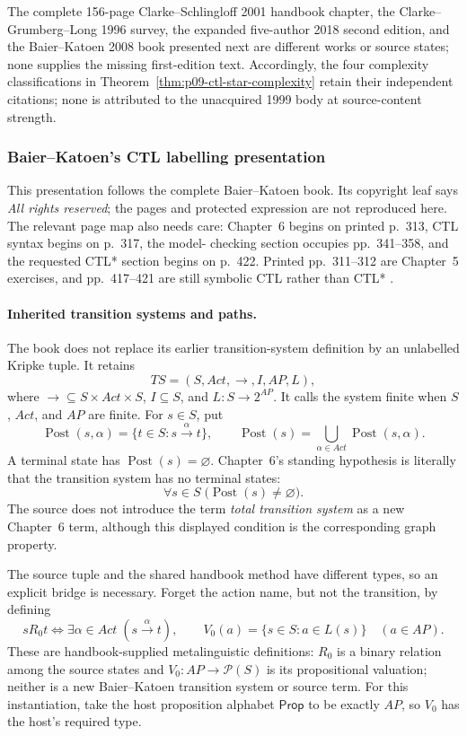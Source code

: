 The complete 156-page Clarke--Schlingloff 2001 handbook chapter, the
Clarke--Grumberg--Long 1996 survey, the expanded five-author 2018 second
edition, and the Baier--Katoen 2008 book presented next are different works or
source states; none supplies the missing first-edition text.  Accordingly,
the four complexity classifications in
Theorem~\ref{thm:p09-ctl-star-complexity} retain their independent citations;
none is attributed to the unacquired 1999 body at source-content strength.

\subsubsection{Baier--Katoen's CTL labelling presentation}
\label{sec:p09-presentation-n-c-016-baier-katoen}

This presentation follows the complete Baier--Katoen book.  Its copyright leaf
says \emph{All rights reserved}; the pages and protected expression are not
reproduced here.  The relevant page map also needs care:
Chapter~6 begins on printed p.~313, CTL syntax begins on p.~317, the model-
checking section occupies pp.~341--358, and the requested CTL* section begins
on p.~422.  Printed pp.~311--312 are Chapter~5 exercises, and pp.~417--421 are
still symbolic CTL rather than CTL* \cite{BaierKatoen2008}.

\paragraph{Inherited transition systems and paths.}
The book does not replace its earlier transition-system definition by an
unlabelled Kripke tuple.  It retains
\[
 TS=(S,Act,{\to},I,AP,L),
\]
where \({\to}\subseteq S\times Act\times S\), \(I\subseteq S\), and
\(L:S\to2^{AP}\).  It calls the system finite when \(S\), \(Act\), and
\(AP\) are finite.  For \(s\in S\), put
\[
 \operatorname{Post}(s,\alpha)
   =\{t\in S:s\xrightarrow{\alpha}t\},
 \qquad
 \operatorname{Post}(s)
   =\bigcup_{\alpha\in Act}\operatorname{Post}(s,\alpha).
\]
A terminal state has \(\operatorname{Post}(s)=\varnothing\).  Chapter~6's
standing hypothesis is literally that the transition system has no terminal
states:
\[
 \forall s\in S\;\bigl(\operatorname{Post}(s)\ne\varnothing\bigr).
\]
The source does not introduce the term \emph{total transition system} as a new
Chapter~6 term, although this displayed condition is the corresponding graph
property.

The source tuple and the shared handbook method have different types, so an
explicit bridge is necessary.  Forget the action name, but not the transition,
by defining
\[
 sR_0t\iff\exists\alpha\in Act\;(s\xrightarrow{\alpha}t),
 \qquad
 V_0(a)=\{s\in S:a\in L(s)\}\quad(a\in AP).
\]
These are handbook-supplied metalinguistic definitions: \(R_0\) is a binary
relation among the source states and \(V_0:AP\to\mathcal P(S)\) is its
propositional valuation; neither is a new Baier--Katoen transition system or
source term.  For this instantiation, take the host proposition alphabet
\(\mathsf{Prop}\) to be exactly \(AP\), so \(V_0\) has the host's required
type.


